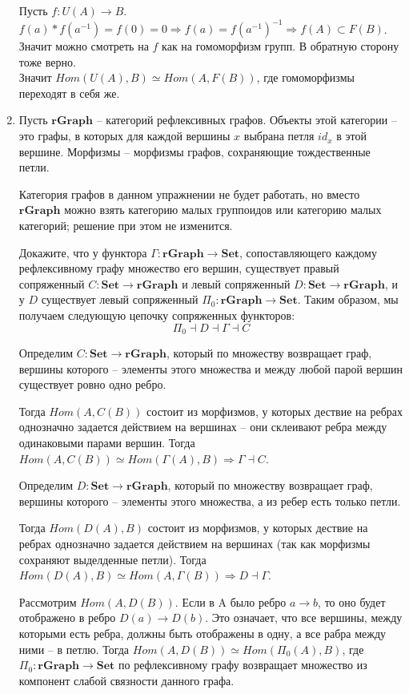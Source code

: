 \documentclass[draft]{article}
\newcommand{\cat}[1]{\mathbf{#1}}
\newcommand{\Set}{\cat{Set}}
\begin{document}
\begin{enumerate}
Пусть $f: U(A) \to B$. $f(a) * f(a^{-1}) = f(0) = 0 \Rightarrow f(a) = f(a^{-1})^{-1} \Rightarrow f(A) \subset F(B)$. Значит можно смотреть на $f$ как на гомоморфизм групп. В обратную сторону тоже верно. \\
Значит $Hom(U(A), B) \simeq Hom(A, F(B))$, где гомоморфизмы переходят в себя же.


\item Пусть $\cat{rGraph}$ -- категорий рефлексивных графов.
Объекты этой категории -- это графы, в которых для каждой вершины $x$ выбрана петля $id_x$ в этой вершине.
Морфизмы -- морфизмы графов, сохраняющие тождественные петли.

Категория графов в данном упражнении не будет работать, но вместо $\cat{rGraph}$ можно взять категорию малых группоидов или категорию малых категорий; решение при этом не изменится.

Докажите, что у функтора $\Gamma : \cat{rGraph} \to \Set$, сопоставляющего каждому рефлексивному графу множество его вершин, существует правый сопряженный $C : \Set \to \cat{rGraph}$ и левый сопряженный $D : \Set \to \cat{rGraph}$,
и у $D$ существует левый сопряженный $\Pi_0 : \cat{rGraph} \to \Set$.
Таким образом, мы получаем следующую цепочку сопряженных функторов:
\[ \Pi_0 \dashv D \dashv \Gamma \dashv C \]

Определим $C : \Set \to \cat{rGraph}$, который по множеству возвращает граф, вершины которого -- элементы этого множества и между любой парой вершин существует ровно одно ребро.

Тогда $Hom(A, C(B))$ состоит из морфизмов, у которых дествие на ребрах однозначно задается действием на вершинах -- они склеивают ребра между одинаковыми парами вершин. Тогда \\ $Hom(A, C(B)) \simeq Hom(\Gamma(A), B) \Rightarrow \Gamma \dashv C$. 

Определим $D : \Set \to \cat{rGraph}$, который по множеству возвращает граф, вершины которого -- элементы этого множества, а из ребер есть только петли.

Тогда $Hom(D(A), B)$ состоит из морфизмов, у которых дествие на ребрах однозначно задается действием на вершинах (так как морфизмы сохраняют выделденные петли). Тогда \\ $Hom(D(A), B) \simeq Hom(A, \Gamma(B)) \Rightarrow D \dashv \Gamma $. 

Рассмотрим $Hom(A, D(B))$. Если в A было ребро $a \to b$, то оно будет отображено в ребро $D(a) \to D(b)$. Это означает, что все вершины, между которыми есть ребра, должны быть отображены в одну, а все рабра между ними -- в петлю. Тогда $Hom(A, D(B)) \simeq Hom(\Pi_0(A), B)$, где $\Pi_0 : \cat{rGraph} \to \Set$ по рефлексивному графу возвращает множество из компонент слабой связности данного графа. 



\end{enumerate}
\end{document}
